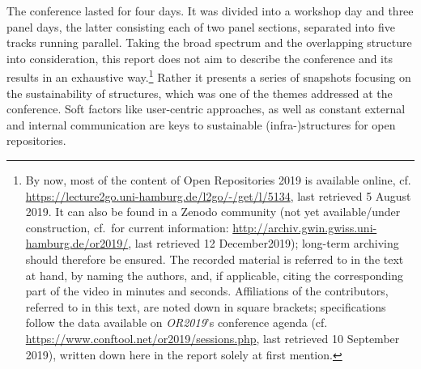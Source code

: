 \documentclass[a4paper,
fontsize=11pt,
oneside,
numbers=noperiodatend,
parskip=half-,
bibliography=totoc,
final
]{scrartcl}
\begin{document}
The conference lasted for four days. It was divided into a workshop day
and three panel days, the latter consisting each of two panel sections,
separated into five tracks running parallel. Taking the broad spectrum
and the overlapping structure into consideration, this report does not
aim to describe the conference and its results in an exhaustive
way.\footnote{By now, most of the content of Open Repositories 2019 is
  available online, cf.
  \url{https://lecture2go.uni-hamburg.de/l2go/-/get/l/5134}, last
  retrieved 5 August 2019. It can also be found in a Zenodo community
  (not yet available/under construction, cf.~for current information:
  \url{http://archiv.gwin.gwiss.uni-hamburg.de/or2019/}, last retrieved
  12 December2019); long-term archiving should therefore be ensured. The
  recorded material is referred to in the text at hand, by naming the
  authors, and, if applicable, citing the corresponding part of the
  video in minutes and seconds. Affiliations of the contributors,
  referred to in this text, are noted down in square brackets;
  specifications follow the data available on \emph{OR2019}'s conference
  agenda (cf. \url{https://www.conftool.net/or2019/sessions.php}, last
  retrieved 10 September 2019), written down here in the report solely
  at first mention.} Rather it presents a series of snapshots focusing
on the sustainability of structures, which was one of the themes
addressed at the conference. Soft factors like user-centric approaches,
as well as constant external and internal communication are keys to
sustainable (infra-)structures for open repositories.
\end{document}
